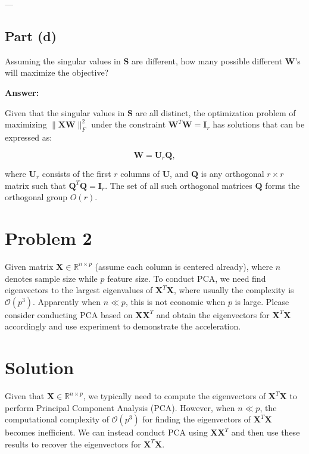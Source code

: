 \documentclass[11pt]{article}
\newcommand{\R}{\mathbb{R}}
\newcommand{\mtx}[1]{\mathbf{#1}}
\def \mS {\mtx{S}}
\def \mW {\mtx{W}}
\def \mX {\mtx{X}}
\def \R {\mathbb{R}}
\begin{document}
---

\subsection*{Part (d)}
Assuming the singular values in $\mS$ are different, how many possible different $\bm{\mW}$'s will maximize the objective?

\textbf{Answer:}

Given that the singular values in \(\mathbf{S}\) are all distinct, the optimization problem of maximizing \(\|\mathbf{X} \mathbf{W}\|_F^2\) under the constraint \(\mathbf{W}^T \mathbf{W} = \mathbf{I}_r\) has solutions that can be expressed as:

\[
\mathbf{W} = \mathbf{U}_r \mathbf{Q},
\]

where \(\mathbf{U}_r\) consists of the first \(r\) columns of \(\mathbf{U}\), and \(\mathbf{Q}\) is any orthogonal \(r \times r\) matrix such that \(\mathbf{Q}^T \mathbf{Q} = \mathbf{I}_r\). The set of all such orthogonal matrices \(\mathbf{Q}\) forms the orthogonal group \(O(r)\).

\newpage

\section*{Problem 2}
	Given matrix $\mX\in\R^{n\times p}$ (assume each column is centered already), where $n$ denotes sample size while $p$ feature size. To conduct PCA, we need find eigenvectors to the  largest eigenvalues of $\mX^T\mX$, where usually the complexity is $\mathcal{O}(p^3)$. Apparently when $n\ll p$, this is not economic when $p$ is large. Please consider conducting PCA based on $\mX\mX^T$ and obtain the eigenvectors for $\mX^T\mX$ accordingly and use experiment to demonstrate the acceleration.

	\section*{Solution}

	Given that $\mathbf{X} \in \mathbb{R}^{n \times p}$, we typically need to compute the eigenvectors of $\mathbf{X}^T \mathbf{X}$ to perform Principal Component Analysis (PCA). However, when $n \ll p$, the computational complexity of $\mathcal{O}(p^3)$ for finding the eigenvectors of $\mathbf{X}^T \mathbf{X}$ becomes inefficient. We can instead conduct PCA using $\mathbf{X} \mathbf{X}^T$ and then use these results to recover the eigenvectors for $\mathbf{X}^T \mathbf{X}$.
	
\end{document}
